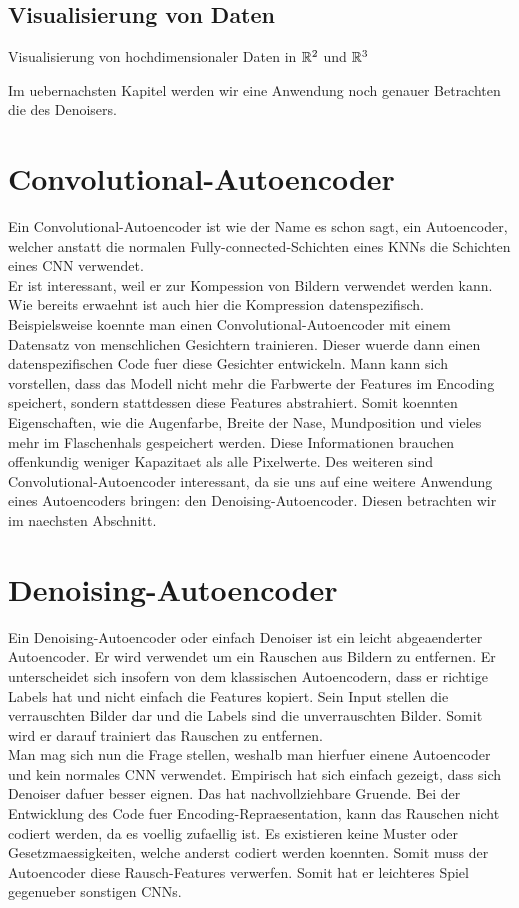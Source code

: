 \subsection{Visualisierung von Daten}
Visualisierung von hochdimensionaler Daten in $\mathbb{R}^2$ und $\mathbb{R}^3$


Im uebernachsten Kapitel werden wir eine Anwendung noch genauer Betrachten die
des Denoisers.

\section{Convolutional-Autoencoder}
Ein Convolutional-Autoencoder ist wie der Name es schon sagt, ein Autoencoder,
welcher anstatt die normalen Fully-connected-Schichten eines KNNs die Schichten eines CNN verwendet. \\
Er ist interessant, weil er zur Kompession von Bildern verwendet werden kann.
Wie bereits erwaehnt ist auch hier die Kompression datenspezifisch.
Beispielsweise koennte man einen Convolutional-Autoencoder mit einem Datensatz
von menschlichen Gesichtern trainieren. Dieser wuerde dann einen
datenspezifischen Code fuer diese Gesichter entwickeln. Mann kann sich
vorstellen, dass das Modell nicht mehr die Farbwerte der Features im Encoding
speichert, sondern stattdessen diese Features abstrahiert. Somit koennten
Eigenschaften, wie die Augenfarbe, Breite der Nase, Mundposition und vieles mehr
im Flaschenhals gespeichert werden. Diese Informationen brauchen offenkundig
weniger Kapazitaet als alle Pixelwerte.
\para{}
Des weiteren sind Convolutional-Autoencoder interessant, da sie uns auf eine
weitere Anwendung eines Autoencoders bringen: den Denoising-Autoencoder.
Diesen betrachten wir im naechsten Abschnitt.

\cite{yt:autoencoder_faces}

\section{Denoising-Autoencoder}
Ein Denoising-Autoencoder oder einfach Denoiser ist ein leicht abgeaenderter
Autoencoder. Er wird verwendet um ein Rauschen aus Bildern zu entfernen.
\para{}
Er unterscheidet sich insofern von dem klassischen Autoencodern, dass er
richtige Labels hat und nicht einfach die Features kopiert. Sein Input stellen
die verrauschten Bilder dar und die Labels sind die unverrauschten Bilder. Somit
wird er darauf trainiert das Rauschen zu entfernen. \\
Man mag sich nun die Frage stellen, weshalb man hierfuer einene Autoencoder und
kein normales CNN verwendet. Empirisch hat sich einfach gezeigt, dass sich
Denoiser dafuer besser eignen. Das hat nachvollziehbare Gruende. Bei der
Entwicklung des Code fuer Encoding-Repraesentation, kann das Rauschen nicht
codiert werden, da es voellig zufaellig ist. Es existieren keine Muster oder
Gesetzmaessigkeiten, welche anderst codiert werden koennten. Somit muss der
Autoencoder diese Rausch-Features verwerfen. Somit hat er leichteres Spiel
gegenueber sonstigen CNNs.


